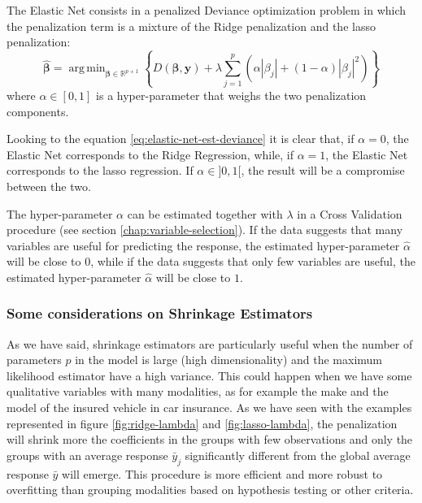 \documentclass[a4paper, twoside, openright, 12pt]{report}
\DeclareMathOperator*{\argmin}{arg\,min}  %
\theoremstyle{definition}
\theoremstyle{definition}
\theoremstyle{definition}
\theoremstyle{remark}
\begin{document}
The Elastic Net consists in a penalized Deviance optimization problem in which the penalization term is a mixture of the Ridge penalization and the \ac{lasso} penalization:
\begin{equation}
\label{eq:elastic-net-est-deviance}
\hat{\boldsymbol{\beta}} =  \argmin_{\boldsymbol{\beta}\in\mathbb{R}^{p+1}}{\left\{
D(\boldsymbol{\beta}, \boldsymbol{y}) +
\lambda 
\sum_{j=1}^p{\left(\alpha |\beta_j| + (1 - \alpha) |\beta_j|^2\right)}
\right\}}
\end{equation}
where \(\alpha \in [0,1]\) is a hyper-parameter that weighs the two penalization components.

Looking to the equation \eqref{eq:elastic-net-est-deviance} it is clear that, if \(\alpha=0\), the Elastic Net corresponds to the Ridge Regression, while, if \(\alpha=1\), the Elastic Net corresponds to the \ac{lasso} regression. If \(\alpha \in ]0,1[\), the result will be a compromise between the two.

The hyper-parameter \(\alpha\) can be estimated together with \(\lambda\) in a Cross Validation procedure (see section \ref{chap:variable-selection}). If the data suggests that many variables are useful for predicting the response, the estimated hyper-parameter \(\hat{\alpha}\) will be close to \(0\), while if the data suggests that only few variables are useful, the estimated hyper-parameter \(\hat{\alpha}\) will be close to \(1\).

\hypertarget{chap:shrinkage-considerations}{%
\subsubsection{Some considerations on Shrinkage Estimators}\label{chap:shrinkage-considerations}}

As we have said, shrinkage estimators are particularly useful when the number of parameters \(p\) in the model is large (high dimensionality) and the maximum likelihood estimator have a high variance. This could happen when we have some qualitative variables with many modalities, as for example the make and the model of the insured vehicle in car insurance. As we have seen with the examples represented in figure \ref{fig:ridge-lambda} and \ref{fig:lasso-lambda}, the penalization will shrink more the coefficients in the groups with few observations and only the groups with an average response \(\bar{y}_j\) significantly different from the global average response \(\bar{y}\) will emerge. This procedure is more efficient and more robust to overfitting than grouping modalities based on hypothesis testing or other criteria.
\end{document}
